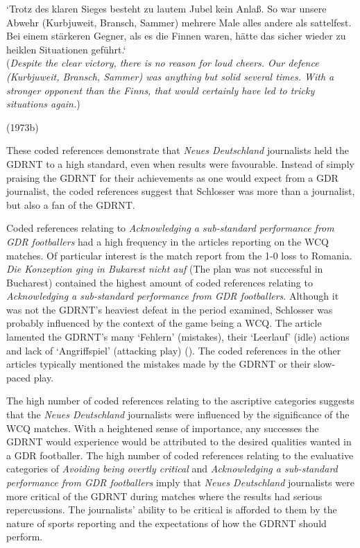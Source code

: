 \begin{displayquote}
\begin{small}
‘Trotz des klaren Sieges besteht zu lautem Jubel kein Anlaß. So war unsere Abwehr (Kurbjuweit, Bransch, Sammer) mehrere Male alles andere als sattelfest. Bei einem stärkeren Gegner, als es die Finnen waren, hätte das sicher wieder zu heiklen Situationen geführt.‘\\
(\textit{Despite the clear victory, there is no reason for loud cheers. Our defence (Kurbjuweit, Bransch, Sammer) was anything but solid several times. With a stronger opponent than the Finns, that would certainly have led to tricky situations again.})\
\begin{flushright}\footnotesize (1973b)\end{flushright}
\end{small}
\end{displayquote}

These coded references demonstrate that \textit{Neues Deutschland} journalists held the GDRNT to a high standard, even when results were favourable. Instead of simply praising the GDRNT for their achievements as one would expect from a GDR journalist, the coded references suggest that Schlosser was more than a journalist, but also a fan of the GDRNT.

Coded references relating to \textit{Acknowledging a sub-standard performance from GDR footballers} had a high frequency in the articles reporting on the WCQ matches. Of particular interest is the match report from the 1-0 loss to Romania. \textit{Die Konzeption ging in Bukarest nicht auf} (The plan was not successful in Bucharest) contained the highest amount of coded references relating to \textit{Acknowledging a sub-standard performance from GDR footballers}. Although it was not the GDRNT’s heaviest defeat in the period examined, Schlosser was probably influenced by the context of the game being a WCQ. The article lamented the GDRNT’s many ‘Fehlern’ (mistakes), their ‘Leerlauf’ (idle) actions and lack of ‘Angriffspiel’ (attacking play) (\cite{nd19730528}). The coded references in the other articles typically mentioned the mistakes made by the GDRNT or their slow-paced play.

The high number of coded references relating to the ascriptive categories suggests that the \textit{Neues Deutschland} journalists were influenced by the significance of the WCQ matches. With a heightened sense of importance, any successes the GDRNT would experience would be attributed to the desired qualities wanted in a GDR footballer. The high number of coded references relating to the evaluative categories of \textit{Avoiding being overtly critical} and \textit{Acknowledging a sub-standard performance from GDR footballers} imply that \textit{Neues Deutschland} journalists were more critical of the GDRNT during matches where the results had serious repercussions. The journalists’ ability to be critical is afforded to them by the nature of sports reporting and the expectations of how the GDRNT should perform.

